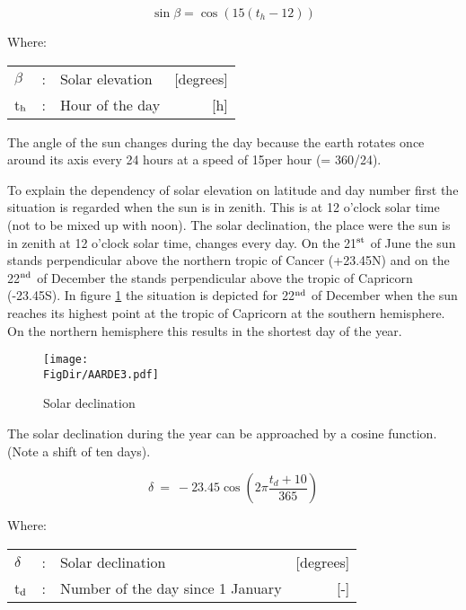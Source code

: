 \begin{equation}
\sin \beta = \cos (15(t _{h} -12))
\end{equation}

Where:\\[5pt]
\begin{tabularx}{\textwidth}{llXr}
	$\beta$ &:& Solar elevation  & [degrees]\\
	t$_{{\rm h}}$ &:& Hour of the day  & [h]\\
\end{tabularx}

The angle of the sun changes during the day because the earth rotates once around its axis
every 24 hours at a speed of 15\degrees per hour (= 360/24).  

To explain the dependency of solar elevation on latitude and day number first the situation
is regarded when the sun is in zenith. This is at 12 o'clock solar time (not to be mixed up
with noon). The solar declination, the place were the sun is in zenith at 12 o'clock solar
time, changes every day. On the 21$^{\rm st}$ of June the sun stands perpen\-dicular above 
the northern tropic of Cancer (+23.45\degrees N) and on the 22$^{\rm nd}$ of December the 
stands perpendicular above the tropic of Capricorn (-23.45\degrees S). In figure 
\ref{fig:solardecl} the situation is depicted for 22$^{\rm nd}$ of December when the sun 
reaches its highest point at the tropic of Capricorn at the southern hemisphere. On the 
northern hemisphere this results in the shortest day of the year.

\begin{figure}[p]
	\centering
	\texttt{[image: \\FigDir/AARDE3.pdf]}
	\caption{Solar declination}
	\label{fig:solardecl}
\end{figure}

The solar declination during the year can be approached by a cosine function. (Note a shift of ten days).

\begin{equation}
\delta ~=~ -23.45 \cos ( 2 \pi {\frac{t _{d} + 10}{365}} )
\end{equation}

Where:\\[5pt]
\begin{tabularx}{\textwidth}{llXr}
	$\delta$ &:& Solar declination   & [de\-grees]\\
	t$_{{\rm d}}$ &:& Number of the day since 1 January   & [-]\\
\end{tabularx}

